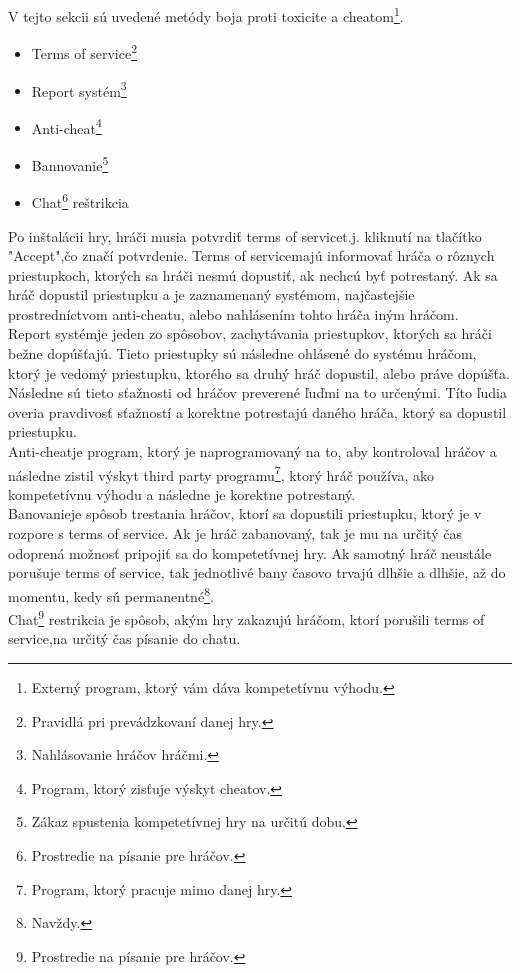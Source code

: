 \documentclass[twoside,twocolumn]{article}
\begin{document}
V tejto sekcii sú uvedené metódy boja proti toxicite a cheatom\footnote[1]{Externý program, ktorý vám dáva kompetetívnu výhodu.}.
\begin{itemize}
\item Terms of service\footnote[2]{Pravidlá pri prevádzkovaní danej hry.}
\item Report systém\footnote[3]{Nahlásovanie hráčov hráčmi.}
\item Anti-cheat\footnote[4]{Program, ktorý zisťuje výskyt cheatov.}
\item Bannovanie\footnote[5]{Zákaz spustenia kompetetívnej hry na určitú dobu.}
\item Chat\footnote[6]{Prostredie na písanie pre hráčov.} reštrikcia
\end{itemize}
	Po inštalácii hry, hráči musia potvrdiť terms of service\footnotemark[2]t.j. kliknutí na tlačítko "Accept",čo značí potvrdenie. Terms of service\footnotemark[2] majú informovať hráča o rôznych priestupkoch, ktorých sa hráči nesmú dopustiť, ak nechcú byť potrestaný. Ak sa hráč dopustil priestupku a je zaznamenaný systémom, najčastejšie prostredníctvom anti-cheatu\footnotemark[4], alebo nahlásením tohto hráča iným hráčom.\\
	Report systém\footnotemark[3] je jeden zo spôsobov, zachytávania priestupkov, ktorých sa hráči bežne dopúšťajú. Tieto priestupky sú následne ohlásené do systému hráčom, ktorý je vedomý priestupku, ktorého sa druhý hráč dopustil, alebo práve dopúšťa. Následne sú tieto sťažnosti od hráčov preverené ľuďmi na to určenými. Títo ľudia overia pravdivosť sťažností a korektne potrestajú daného hráča, ktorý sa dopustil priestupku.\\
	Anti-cheat\footnotemark[4] je program, ktorý je naprogramovaný na to, aby kontroloval hráčov a následne zistil výskyt third party programu\footnote[7]{Program, ktorý pracuje mimo danej hry.}, ktorý hráč používa, ako kompetetívnu výhodu a následne je korektne potrestaný.\\
	Banovanie\footnotemark[5] je spôsob trestania hráčov, ktorí sa dopustili priestupku, ktorý je v rozpore s terms of service\footnotemark[2]. Ak je hráč zabanovaný\footnotemark[5], tak je mu na určitý čas odoprená možnosť pripojiť sa do kompetetívnej hry. Ak samotný hráč neustále porušuje terms of service\footnotemark[2], tak jednotlivé bany časovo trvajú dlhšie a dlhšie, až do momentu, kedy sú permanentné\footnote[8]{Navždy.}.   \\
	Chat\footnote[9]{Prostredie na písanie pre hráčov.} restrikcia je spôsob, akým hry zakazujú hráčom, ktorí porušili terms of service\footnotemark[2],na určitý čas písanie do chatu\footnotemark[9].
\end{document}
